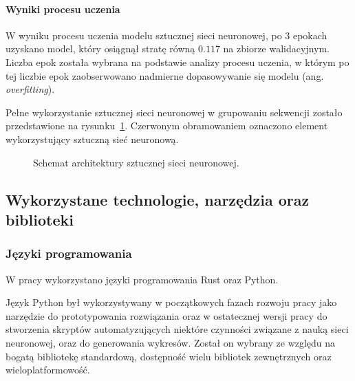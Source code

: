             \paragraph{Wyniki procesu uczenia}
                
                W wyniku procesu uczenia modelu sztucznej sieci neuronowej, po 3 epokach uzyskano model, który osiągnął stratę równą $0.117$ na zbiorze walidacyjnym. Liczba epok została wybrana na podstawie analizy procesu uczenia, w którym po tej liczbie epok zaobserwowano nadmierne dopasowywanie się modelu (ang. \textit{overfitting}).


            Pełne wykorzystanie sztucznej sieci neuronowej w grupowaniu sekwencji zostało przedstawione na rysunku~\ref{Picture:Cluster:Neural}. Czerwonym obramowaniem oznaczono element wykorzystujący sztuczną sieć neuronową.

            \begin{figure}
                \begin{center}
                    
                \end{center}
                \caption{
                    Schemat architektury sztucznej sieci neuronowej.
                }\label{Picture:Cluster:Neural}
            \end{figure}

    \subsection{Wykorzystane technologie, narzędzia oraz biblioteki}

        \subsubsection{Języki programowania}

            W pracy wykorzystano języki programowania Rust\cite{Rust} oraz Python\cite{Python}.
            
            Język Python był wykorzystywany w początkowych fazach rozwoju pracy jako narzędzie do prototypowania rozwiązania oraz w ostatecznej wersji pracy do stworzenia skryptów automatyzujących niektóre czynności związane z nauką sieci neuronowej, oraz do generowania wykresów. Został on wybrany ze względu na bogatą bibliotekę standardową, dostępność wielu bibliotek zewnętrznych oraz wieloplatformowość.
            
